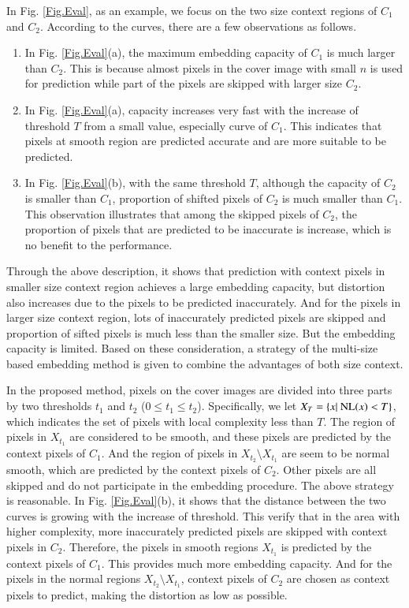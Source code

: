 \documentclass[review,3p,10pt,sort&compress]{elsarticle}
\begin{document}
In Fig. \ref{Fig.Eval}, as an example, we focus on the two size context regions of $C_1$ and $C_2$. According to the curves, there are a few observations as follows.
\begin{enumerate}
  \item In Fig. \ref{Fig.Eval}(a), the maximum embedding capacity of $C_1$ is much larger than $C_2$. This is because almost pixels in the cover image with small $n$ is used for prediction while part of the pixels are skipped with larger size $C_2$.
  \item In Fig. \ref{Fig.Eval}(a), capacity increases very fast with the increase of threshold $T$ from a small value, especially curve of $C_1$. This indicates that pixels at smooth region are predicted accurate and are more suitable to be predicted.
  \item In Fig. \ref{Fig.Eval}(b), with the same threshold $T$, although the capacity of $C_2$ is smaller than $C_1$, proportion of shifted pixels of $C_2$ is much smaller than $C_1$. This observation illustrates that among the skipped pixels of $C_2$, the proportion of pixels that are predicted to be inaccurate is increase, which is no benefit to the performance.
\end{enumerate}
Through the above description, it shows that prediction with context pixels in smaller size context region achieves a large embedding capacity, but distortion also increases due to the pixels to be predicted inaccurately. And for the pixels in larger size context region, lots of inaccurately predicted pixels are skipped and proportion of sifted pixels is much less than the smaller size. But the embedding capacity is limited. Based on these consideration, a strategy of the multi-size based embedding method is given to combine the advantages of both size context.

In the proposed method, pixels on the cover images are divided into three parts by two thresholds $t_1$ and $t_2$ ($0 \leq t_1 \leq t_2$). Specifically, we let $X_{T} = \{x |\ {\rm NL}(x) < T\}$, which indicates the set of pixels with local complexity less than $T$. The region of pixels in $X_{t_1}$ are considered to be smooth, and these pixels are predicted by the context pixels of $C_1$. And the region of pixels in $X_{t_2} \setminus X_{t_1}$ are seem to be normal smooth, which are predicted by the context pixels of $C_2$. Other pixels are all skipped and do not participate in the embedding procedure. The above strategy is reasonable. In Fig. \ref{Fig.Eval}(b), it shows that the distance between the two curves is growing with the increase of threshold. This verify that in the area with higher complexity, more inaccurately predicted pixels are skipped with context pixels in $C_2$. Therefore, the pixels in smooth regions $X_{t_1}$ is predicted by the context pixels of $C_1$. This provides much more embedding capacity. And for the pixels in the normal regions $X_{t_2} \setminus X_{t_1}$, context pixels of $C_2$ are chosen as context pixels to predict, making the distortion as low as possible.
\end{document}
